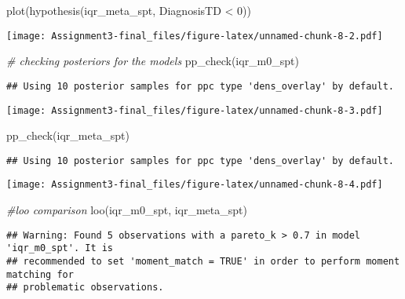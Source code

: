 \documentclass[
]{article}
\newenvironment{Shaded}{\begin{snugshade}}{\end{snugshade}}
\newcommand{\CommentTok}[1]{\textcolor[rgb]{0.56,0.35,0.01}{\textit{#1}}}
\newcommand{\FunctionTok}[1]{\textcolor[rgb]{0.00,0.00,0.00}{#1}}
\newcommand{\NormalTok}[1]{#1}
\newcommand{\StringTok}[1]{\textcolor[rgb]{0.31,0.60,0.02}{#1}}
\begin{document}
\begin{Shaded}
\begin{Highlighting}[]
\FunctionTok{plot}\NormalTok{(}\FunctionTok{hypothesis}\NormalTok{(iqr\_meta\_spt, }\StringTok{\textquotesingle{}DiagnosisTD \textless{} 0\textquotesingle{}}\NormalTok{))}
\end{Highlighting}
\end{Shaded}

\texttt{[image: Assignment3-final\_files/figure-latex/unnamed-chunk-8-2.pdf]}

\begin{Shaded}
\begin{Highlighting}[]
\CommentTok{\# checking posteriors for the models}
\FunctionTok{pp\_check}\NormalTok{(iqr\_m0\_spt)}
\end{Highlighting}
\end{Shaded}

\begin{verbatim}
## Using 10 posterior samples for ppc type 'dens_overlay' by default.
\end{verbatim}

\texttt{[image: Assignment3-final\_files/figure-latex/unnamed-chunk-8-3.pdf]}

\begin{Shaded}
\begin{Highlighting}[]
\FunctionTok{pp\_check}\NormalTok{(iqr\_meta\_spt)}
\end{Highlighting}
\end{Shaded}

\begin{verbatim}
## Using 10 posterior samples for ppc type 'dens_overlay' by default.
\end{verbatim}

\texttt{[image: Assignment3-final\_files/figure-latex/unnamed-chunk-8-4.pdf]}

\begin{Shaded}
\begin{Highlighting}[]
\CommentTok{\#loo comparison}
\FunctionTok{loo}\NormalTok{(iqr\_m0\_spt, iqr\_meta\_spt)}
\end{Highlighting}
\end{Shaded}

\begin{verbatim}
## Warning: Found 5 observations with a pareto_k > 0.7 in model 'iqr_m0_spt'. It is
## recommended to set 'moment_match = TRUE' in order to perform moment matching for
## problematic observations.
\end{verbatim}
\end{document}

